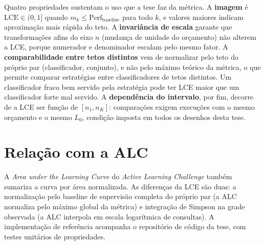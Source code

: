 Quatro propriedades sustentam o uso que a tese faz da métrica. A
\textbf{imagem} é $\mathrm{LCE} \in (0, 1]$ quando
$m_k \le \mathrm{Perf}_{\mathrm{baseline}}$ para todo $k$, e valores maiores
indicam aproximação mais rápida do teto. A \textbf{invariância de escala}
garante que transformações afins do eixo $n$ (mudança de unidade do
orçamento) não alterem a LCE, porque numerador e denominador escalam pelo
mesmo fator. A \textbf{comparabilidade entre tetos distintos} vem de
normalizar pelo teto do próprio par (classificador, conjunto), e não pelo
máximo teórico da métrica, o que permite comparar estratégias entre
classificadores de tetos distintos. Um classificador fraco bem servido pela
estratégia pode ter LCE maior que um classificador forte mal servido. A
\textbf{dependência do intervalo}, por fim, decorre de a LCE ser função de
$[n_1, n_K]$: comparações exigem execuções com o mesmo orçamento e o mesmo
$L_0$, condição imposta em todos os desenhos desta tese.

\section{Relação com a ALC}

A \textit{Area under the Learning Curve} do \textit{Active Learning
Challenge} \citep{Guyon2011ALC} também sumariza a curva por área normalizada.
As diferenças da LCE são duas: a normalização pelo baseline de supervisão
completa do próprio par (a ALC normaliza pelo máximo global da métrica) e integração de
Simpson na grade observada (a ALC interpola em escala logarítmica de
consultas). A implementação de referência acompanha o repositório de código
da tese, com testes unitários de propriedades.
